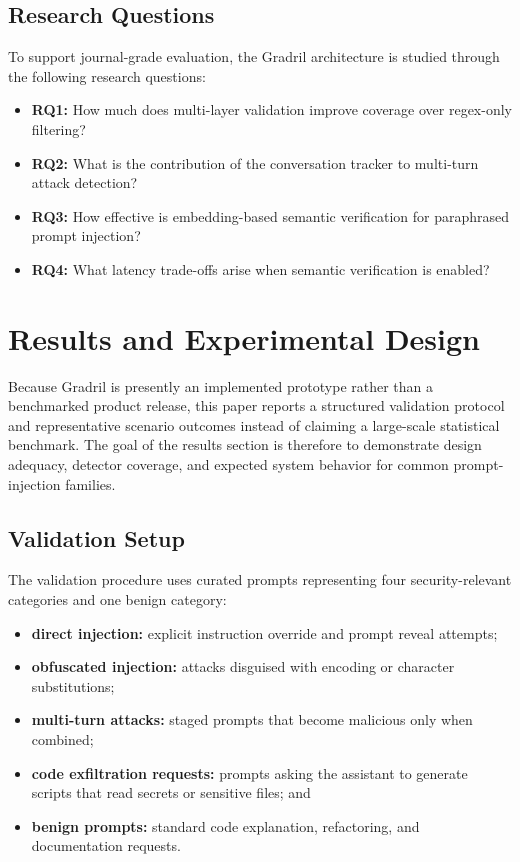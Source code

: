 \documentclass[journal]{IEEEtran}
\begin{document}
\subsection{Research Questions}
To support journal-grade evaluation, the Gradril architecture is studied through the following research questions:
\begin{itemize}
    \item \textbf{RQ1:} How much does multi-layer validation improve coverage over regex-only filtering?
    \item \textbf{RQ2:} What is the contribution of the conversation tracker to multi-turn attack detection?
    \item \textbf{RQ3:} How effective is embedding-based semantic verification for paraphrased prompt injection?
    \item \textbf{RQ4:} What latency trade-offs arise when semantic verification is enabled?
\end{itemize}

\section{Results and Experimental Design}
Because Gradril is presently an implemented prototype rather than a benchmarked product release, this paper reports a structured validation protocol and representative scenario outcomes instead of claiming a large-scale statistical benchmark. The goal of the results section is therefore to demonstrate design adequacy, detector coverage, and expected system behavior for common prompt-injection families.

\subsection{Validation Setup}
The validation procedure uses curated prompts representing four security-relevant categories and one benign category:
\begin{itemize}
    \item \textbf{direct injection:} explicit instruction override and prompt reveal attempts;
    \item \textbf{obfuscated injection:} attacks disguised with encoding or character substitutions;
    \item \textbf{multi-turn attacks:} staged prompts that become malicious only when combined;
    \item \textbf{code exfiltration requests:} prompts asking the assistant to generate scripts that read secrets or sensitive files; and
    \item \textbf{benign prompts:} standard code explanation, refactoring, and documentation requests.
\end{itemize}
\end{document}
